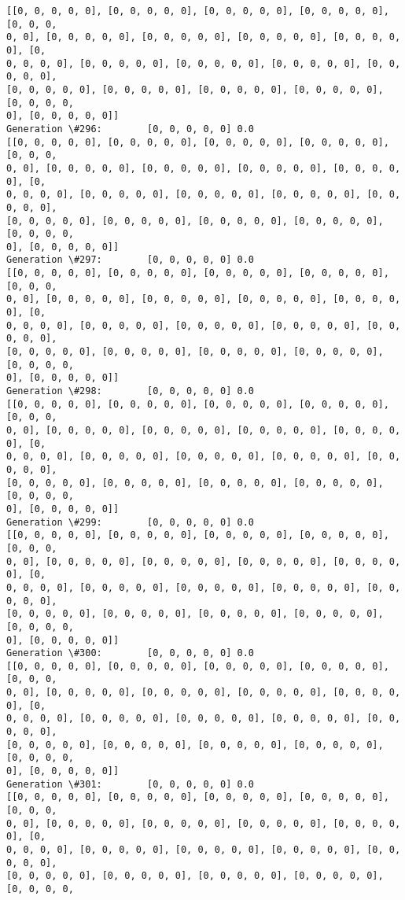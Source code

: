 \documentclass[11pt]{article}
\begin{document}
\begin{Verbatim}[commandchars=\\\{\}]
[[0, 0, 0, 0, 0], [0, 0, 0, 0, 0], [0, 0, 0, 0, 0], [0, 0, 0, 0, 0], [0, 0, 0,
0, 0], [0, 0, 0, 0, 0], [0, 0, 0, 0, 0], [0, 0, 0, 0, 0], [0, 0, 0, 0, 0], [0,
0, 0, 0, 0], [0, 0, 0, 0, 0], [0, 0, 0, 0, 0], [0, 0, 0, 0, 0], [0, 0, 0, 0, 0],
[0, 0, 0, 0, 0], [0, 0, 0, 0, 0], [0, 0, 0, 0, 0], [0, 0, 0, 0, 0], [0, 0, 0, 0,
0], [0, 0, 0, 0, 0]]
Generation \#296:        [0, 0, 0, 0, 0] 0.0
[[0, 0, 0, 0, 0], [0, 0, 0, 0, 0], [0, 0, 0, 0, 0], [0, 0, 0, 0, 0], [0, 0, 0,
0, 0], [0, 0, 0, 0, 0], [0, 0, 0, 0, 0], [0, 0, 0, 0, 0], [0, 0, 0, 0, 0], [0,
0, 0, 0, 0], [0, 0, 0, 0, 0], [0, 0, 0, 0, 0], [0, 0, 0, 0, 0], [0, 0, 0, 0, 0],
[0, 0, 0, 0, 0], [0, 0, 0, 0, 0], [0, 0, 0, 0, 0], [0, 0, 0, 0, 0], [0, 0, 0, 0,
0], [0, 0, 0, 0, 0]]
Generation \#297:        [0, 0, 0, 0, 0] 0.0
[[0, 0, 0, 0, 0], [0, 0, 0, 0, 0], [0, 0, 0, 0, 0], [0, 0, 0, 0, 0], [0, 0, 0,
0, 0], [0, 0, 0, 0, 0], [0, 0, 0, 0, 0], [0, 0, 0, 0, 0], [0, 0, 0, 0, 0], [0,
0, 0, 0, 0], [0, 0, 0, 0, 0], [0, 0, 0, 0, 0], [0, 0, 0, 0, 0], [0, 0, 0, 0, 0],
[0, 0, 0, 0, 0], [0, 0, 0, 0, 0], [0, 0, 0, 0, 0], [0, 0, 0, 0, 0], [0, 0, 0, 0,
0], [0, 0, 0, 0, 0]]
Generation \#298:        [0, 0, 0, 0, 0] 0.0
[[0, 0, 0, 0, 0], [0, 0, 0, 0, 0], [0, 0, 0, 0, 0], [0, 0, 0, 0, 0], [0, 0, 0,
0, 0], [0, 0, 0, 0, 0], [0, 0, 0, 0, 0], [0, 0, 0, 0, 0], [0, 0, 0, 0, 0], [0,
0, 0, 0, 0], [0, 0, 0, 0, 0], [0, 0, 0, 0, 0], [0, 0, 0, 0, 0], [0, 0, 0, 0, 0],
[0, 0, 0, 0, 0], [0, 0, 0, 0, 0], [0, 0, 0, 0, 0], [0, 0, 0, 0, 0], [0, 0, 0, 0,
0], [0, 0, 0, 0, 0]]
Generation \#299:        [0, 0, 0, 0, 0] 0.0
[[0, 0, 0, 0, 0], [0, 0, 0, 0, 0], [0, 0, 0, 0, 0], [0, 0, 0, 0, 0], [0, 0, 0,
0, 0], [0, 0, 0, 0, 0], [0, 0, 0, 0, 0], [0, 0, 0, 0, 0], [0, 0, 0, 0, 0], [0,
0, 0, 0, 0], [0, 0, 0, 0, 0], [0, 0, 0, 0, 0], [0, 0, 0, 0, 0], [0, 0, 0, 0, 0],
[0, 0, 0, 0, 0], [0, 0, 0, 0, 0], [0, 0, 0, 0, 0], [0, 0, 0, 0, 0], [0, 0, 0, 0,
0], [0, 0, 0, 0, 0]]
Generation \#300:        [0, 0, 0, 0, 0] 0.0
[[0, 0, 0, 0, 0], [0, 0, 0, 0, 0], [0, 0, 0, 0, 0], [0, 0, 0, 0, 0], [0, 0, 0,
0, 0], [0, 0, 0, 0, 0], [0, 0, 0, 0, 0], [0, 0, 0, 0, 0], [0, 0, 0, 0, 0], [0,
0, 0, 0, 0], [0, 0, 0, 0, 0], [0, 0, 0, 0, 0], [0, 0, 0, 0, 0], [0, 0, 0, 0, 0],
[0, 0, 0, 0, 0], [0, 0, 0, 0, 0], [0, 0, 0, 0, 0], [0, 0, 0, 0, 0], [0, 0, 0, 0,
0], [0, 0, 0, 0, 0]]
Generation \#301:        [0, 0, 0, 0, 0] 0.0
[[0, 0, 0, 0, 0], [0, 0, 0, 0, 0], [0, 0, 0, 0, 0], [0, 0, 0, 0, 0], [0, 0, 0,
0, 0], [0, 0, 0, 0, 0], [0, 0, 0, 0, 0], [0, 0, 0, 0, 0], [0, 0, 0, 0, 0], [0,
0, 0, 0, 0], [0, 0, 0, 0, 0], [0, 0, 0, 0, 0], [0, 0, 0, 0, 0], [0, 0, 0, 0, 0],
[0, 0, 0, 0, 0], [0, 0, 0, 0, 0], [0, 0, 0, 0, 0], [0, 0, 0, 0, 0], [0, 0, 0, 0,

\end{Verbatim}
\end{document}
